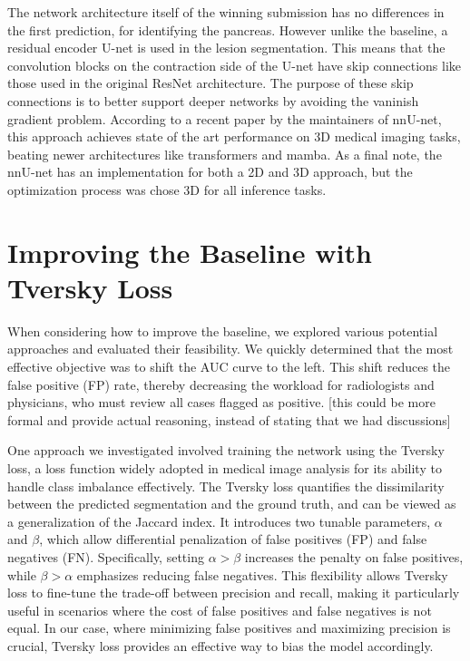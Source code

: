 \documentclass[conference]{IEEEtran}
\begin{document}
The network architecture itself of the winning submission has no differences in the first prediction, for identifying the pancreas. However unlike the baseline, a residual encoder U-net is used in the lesion segmentation. This means that the convolution blocks on the contraction side of the U-net have skip connections like those used in the original ResNet architecture\cite{b12}. The purpose of these skip connections is to better support deeper networks by avoiding the vaninish gradient problem. According to a recent paper by the maintainers of nnU-net, this approach achieves state of the art performance on 3D medical imaging tasks, beating newer architectures like transformers and mamba\cite{b11}. As a final note, the nnU-net has an implementation for both a 2D and 3D approach, but the optimization process was chose 3D for all inference tasks.


\section{Improving the Baseline with Tversky Loss}

When considering how to improve the baseline, we explored various potential approaches and evaluated their feasibility. We quickly determined that the most effective objective was to shift the AUC curve to the left. This shift reduces the false positive (FP) rate, thereby decreasing the workload for radiologists and physicians, who must review all cases flagged as positive. [this could be more formal and provide actual reasoning, instead of stating that we had discussions]

One approach we investigated involved training the network using the Tversky loss, a loss function widely adopted in medical image analysis for its ability to handle class imbalance effectively. The Tversky loss quantifies the dissimilarity between the predicted segmentation and the ground truth, and can be viewed as a generalization of the Jaccard index\cite{b3}. It introduces two tunable parameters, $\alpha$ and $\beta$, which allow differential penalization of false positives (FP) and false negatives (FN). Specifically, setting $\alpha > \beta$ increases the penalty on false positives, while $\beta > \alpha$ emphasizes reducing false negatives. This flexibility allows Tversky loss to fine-tune the trade-off between precision and recall, making it particularly useful in scenarios where the cost of false positives and false negatives is not equal. In our case, where minimizing false positives and maximizing precision is crucial, Tversky loss provides an effective way to bias the model accordingly.
\end{document}
